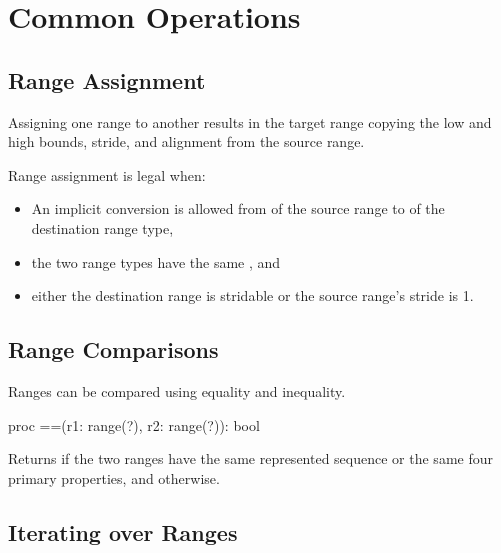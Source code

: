 \section{Common Operations}
\label{Ranges_Common_Operations}

\subsection{Range Assignment}
\label{Range_Assignment}

Assigning one range to another results in the target range
copying the low and high bounds, stride, and alignment
from the source range.

Range assignment is legal when:
\begin{itemize}
\item An implicit conversion is allowed from  of the source range
       to  of the destination range type,
\item the two range types have the same , and
\item either the destination range is stridable or the source range's
      stride is 1.
\end{itemize}

\subsection{Range Comparisons}
\label{Range_Comparisons}

Ranges can be compared using equality and inequality.

\begin{protohead}
proc ==(r1: range(?), r2: range(?)): bool
\end{protohead}
\begin{protobody}
Returns  if the two ranges have the same represented sequence
or the same four primary properties,
and  otherwise.
\end{protobody}

\subsection{Iterating over Ranges}
\label{Iterating_over_Ranges}

